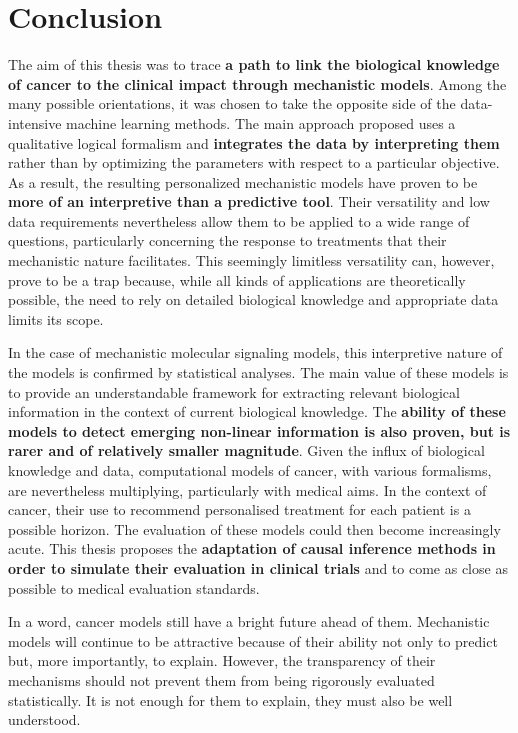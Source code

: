 \documentclass[a4paper,12pt,twoside,onecolumn,openright,final,oldfontcommands]{memoir}
\begin{document}
\chapter*{Conclusion}\label{conclusion}

The aim of this thesis was to trace \textbf{a path to link the
biological knowledge of cancer to the clinical impact through
mechanistic models}. Among the many possible orientations, it was chosen
to take the opposite side of the data-intensive machine learning
methods. The main approach proposed uses a qualitative logical formalism
and \textbf{integrates the data by interpreting them} rather than by
optimizing the parameters with respect to a particular objective. As a
result, the resulting personalized mechanistic models have proven to be
\textbf{more of an interpretive than a predictive tool}. Their
versatility and low data requirements nevertheless allow them to be
applied to a wide range of questions, particularly concerning the
response to treatments that their mechanistic nature facilitates. This
seemingly limitless versatility can, however, prove to be a trap
because, while all kinds of applications are theoretically possible, the
need to rely on detailed biological knowledge and appropriate data
limits its scope.

In the case of mechanistic molecular signaling models, this interpretive
nature of the models is confirmed by statistical analyses. The main
value of these models is to provide an understandable framework for
extracting relevant biological information in the context of current
biological knowledge. The \textbf{ability of these models to detect
emerging non-linear information is also proven, but is rarer and of
relatively smaller magnitude}. Given the influx of biological knowledge
and data, computational models of cancer, with various formalisms, are
nevertheless multiplying, particularly with medical aims. In the context
of cancer, their use to recommend personalised treatment for each
patient is a possible horizon. The evaluation of these models could then
become increasingly acute. This thesis proposes the \textbf{adaptation
of causal inference methods in order to simulate their evaluation in
clinical trials} and to come as close as possible to medical evaluation
standards.

In a word, cancer models still have a bright future ahead of them.
Mechanistic models will continue to be attractive because of their
ability not only to predict but, more importantly, to explain. However,
the transparency of their mechanisms should not prevent them from being
rigorously evaluated statistically. It is not enough for them to
explain, they must also be well understood.
\end{document}
